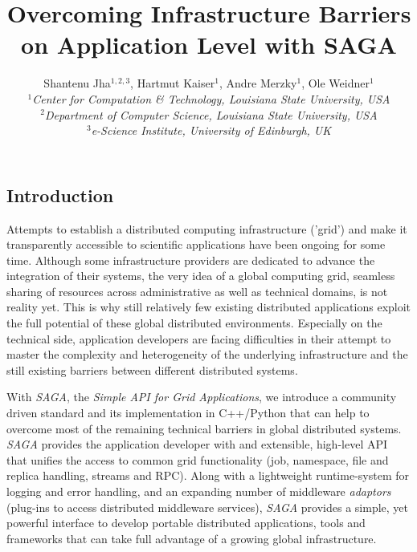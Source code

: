 \documentclass[a4paper,10pt]{article}
\newcommand{\sagaimpl}{\textit{SAGA}\xspace}
\newcommand{\impl}{\sagaimpl}
\newcommand{\jhanote}[1]{  {\textcolor{red}     { ***Shantenu: #1 }}}
\newcommand{\jhanote}[1]{}
\begin{document}
 \title{ \Large \vspace{-3.5em} Overcoming Infrastructure Barriers on Application Level with SAGA }
 
 \author{Shantenu Jha$^{1,2,3}$, Hartmut Kaiser$^{1}$, Andre Merzky$^{1}$, Ole Weidner$^{1}$ \\
   \small{\emph{$^{1}$Center for Computation \& Technology, Louisiana State University, USA}}\\
   \small{\emph{$^{2}$Department of Computer Science, Louisiana State University, USA}}\\
   \small{\emph{$^{3}$e-Science Institute, University of Edinburgh, UK}}
 }
 \date{}
 \maketitle
 




\subsection*{Introduction}
\vspace{-0.5em}
Attempts to establish a distributed computing infrastructure ('grid') and make it transparently accessible to scientific applications have been ongoing for some time. Although some infrastructure providers are dedicated to advance the integration of their systems, the very idea of a global computing grid, seamless sharing of resources across administrative as well as technical domains, is not reality yet. This is why still relatively few existing distributed applications exploit the full potential of these global distributed environments. Especially on the technical side, application developers are facing difficulties in their attempt to master the complexity and heterogeneity of the underlying infrastructure and the still existing barriers between different distributed systems.

With \impl, the \textit{Simple API for Grid Applications}, we introduce a community driven standard and its implementation in C++/Python that can help to overcome most of the remaining technical barriers in global distributed systems. \impl provides the application developer with and extensible, high-level API that unifies the access to common grid functionality (job, namespace, file and replica handling, streams and RPC). Along with a lightweight runtime-system for logging and error handling, and an expanding number of middleware \textit{adaptors} (plug-ins to access distributed middleware services), \impl provides a simple, yet powerful interface to develop portable distributed applications, tools and frameworks that can take full advantage of a growing global infrastructure.
\end{document}
